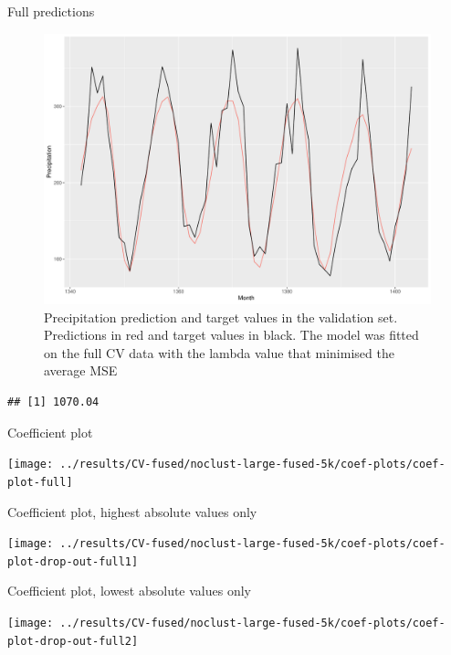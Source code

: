 \documentclass[
  ignorenonframetext,
]{beamer}
\begin{document}
\begin{frame}[fragile]{Full predictions}
\protect\hypertarget{full-predictions}{}
\begin{figure}

{\centering \includegraphics[width=0.75\linewidth]{ma-presentation_files/figure-beamer/pred-plot-full-fused-og-1} 

}

\caption{Precipitation prediction and target values in the validation set. Predictions in red and target values in black. The model was fitted on the full CV data with the lambda value that minimised the average MSE}\label{fig:pred-plot-full-fused-og}
\end{figure}

\begin{verbatim}
## [1] 1070.04
\end{verbatim}
\end{frame}

\begin{frame}{Coefficient plot}
\protect\hypertarget{coefficient-plot}{}
\begin{center}\texttt{[image: ../results/CV-fused/noclust-large-fused-5k/coef-plots/coef-plot-full]} \end{center}
\end{frame}

\begin{frame}{Coefficient plot, highest absolute values only}
\protect\hypertarget{coefficient-plot-highest-absolute-values-only}{}
\begin{center}\texttt{[image: ../results/CV-fused/noclust-large-fused-5k/coef-plots/coef-plot-drop-out-full1]} \end{center}
\end{frame}

\begin{frame}{Coefficient plot, lowest absolute values only}
\protect\hypertarget{coefficient-plot-lowest-absolute-values-only}{}
\begin{center}\texttt{[image: ../results/CV-fused/noclust-large-fused-5k/coef-plots/coef-plot-drop-out-full2]} \end{center}
\end{frame}
\end{document}
